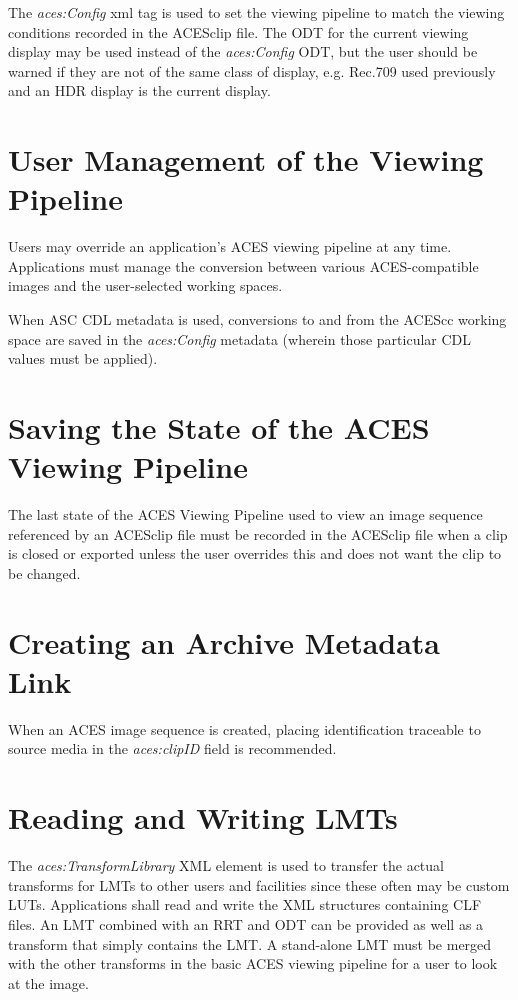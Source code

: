 The \textit{aces:Config} xml tag is used to set the viewing pipeline to match the viewing conditions recorded in the ACESclip file. The ODT for the current viewing display may be used instead of the \textit{aces:Config} ODT, but the user should be warned if they are not of the same class of display, e.g. Rec.709 used previously and an HDR display is the current display.

\section{User Management of the Viewing Pipeline}
Users may override an application’s ACES viewing pipeline at any time.  Applications must manage the conversion between various ACES-compatible images and the user-selected working spaces.

When ASC CDL metadata is used, conversions to and from the ACEScc working space are saved in the \textit{aces:Config} metadata (wherein those particular CDL values must be applied).

\section{Saving the State of the ACES Viewing Pipeline}
The last state of the ACES Viewing Pipeline used to view an image sequence referenced by an ACESclip file must be recorded in the ACESclip file when a clip is closed or exported unless the user overrides this and does not want the clip to be changed.

\section{Creating an Archive Metadata Link}
When an ACES image sequence is created, placing identification traceable to source media in the \textit{aces:clipID} field is recommended.

\section{Reading and Writing LMTs}
The \textit{aces:TransformLibrary} XML element is used to transfer the actual transforms for LMTs to other users and facilities since these often may be custom LUTs. Applications shall read and write the XML structures containing CLF files.  An LMT combined with an RRT and ODT can be provided as well as a transform that simply contains the LMT. A stand-alone LMT must be merged with the other transforms in the basic ACES viewing pipeline for a user to look at the image.

